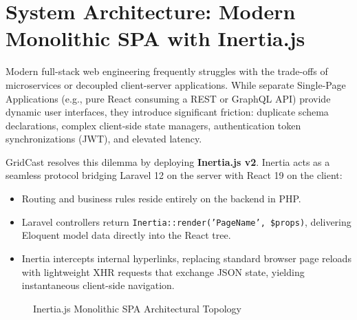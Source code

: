 \documentclass[12pt,a4paper,oneside]{report}
\begin{document}
\section{System Architecture: Modern Monolithic SPA with Inertia.js}
Modern full-stack web engineering frequently struggles with the trade-offs of microservices or decoupled client-server applications. While separate Single-Page Applications (e.g., pure React consuming a REST or GraphQL API) provide dynamic user interfaces, they introduce significant friction: duplicate schema declarations, complex client-side state managers, authentication token synchronizations (JWT), and elevated latency.

GridCast resolves this dilemma by deploying \textbf{Inertia.js v2}. Inertia acts as a seamless protocol bridging Laravel 12 on the server with React 19 on the client:
\begin{itemize}
    \item Routing and business rules reside entirely on the backend in PHP.
    \item Laravel controllers return \texttt{Inertia::render('PageName', \$props)}, delivering Eloquent model data directly into the React tree.
    \item Inertia intercepts internal hyperlinks, replacing standard browser page reloads with lightweight XHR requests that exchange JSON state, yielding instantaneous client-side navigation.
\end{itemize}

\begin{figure}[h!]
\centering
{}
\caption{Inertia.js Monolithic SPA Architectural Topology}
\label{fig:inertia_arch}
\end{figure}
\end{document}

